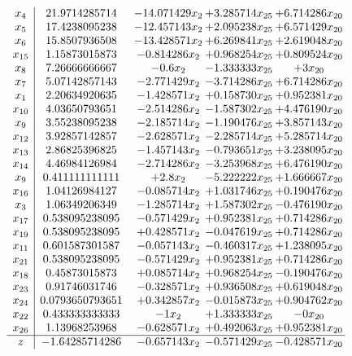 \documentclass[11pt]{article}
\begin{document}
\[\begin{array}{c| c c@{\hskip 2pt} c@{\hskip 2pt} c@{\hskip 2pt} }
 x_{4}   &  21.9714285714 & -14.071429 x_{2} & + 3.285714 x_{25} & + 6.714286 x_{20}\\
 x_{5}   &  17.4238095238 & -12.457143 x_{2} & + 2.095238 x_{25} & + 6.571429 x_{20}\\
 x_{6}   &  15.8507936508 & -13.428571 x_{2} & + 6.269841 x_{25} & + 2.619048 x_{20}\\
 x_{15}   &  1.15873015873 & -0.814286 x_{2} & + 0.968254 x_{25} & + 0.809524 x_{20}\\
 x_{8}   &  7.26666666667 & -0.6 x_{2} & -1.333333 x_{25} & + 3 x_{20}\\
 x_{7}   &  5.07142857143 & -2.771429 x_{2} & -3.714286 x_{25} & + 6.714286 x_{20}\\
 x_{1}   &  2.20634920635 & -1.428571 x_{2} & + 0.158730 x_{25} & + 0.952381 x_{20}\\
 x_{10}   &  4.03650793651 & -2.514286 x_{2} & -1.587302 x_{25} & + 4.476190 x_{20}\\
 x_{9}   &  3.55238095238 & -2.185714 x_{2} & -1.190476 x_{25} & + 3.857143 x_{20}\\
 x_{12}   &  3.92857142857 & -2.628571 x_{2} & -2.285714 x_{25} & + 5.285714 x_{20}\\
 x_{13}   &  2.86825396825 & -1.457143 x_{2} & -0.793651 x_{25} & + 3.238095 x_{20}\\
 x_{14}   &  4.46984126984 & -2.714286 x_{2} & -3.253968 x_{25} & + 6.476190 x_{20}\\
 x_{9}   &  0.411111111111 & + 2.8 x_{2} & -5.222222 x_{25} & + 1.666667 x_{20}\\
 x_{16}   &  1.04126984127 & -0.085714 x_{2} & + 1.031746 x_{25} & + 0.190476 x_{20}\\
 x_{3}   &  1.06349206349 & -1.285714 x_{2} & + 1.587302 x_{25} & -0.476190 x_{20}\\
 x_{17}   &  0.538095238095 & -0.571429 x_{2} & + 0.952381 x_{25} & + 0.714286 x_{20}\\
 x_{19}   &  0.538095238095 & + 0.428571 x_{2} & -0.047619 x_{25} & + 0.714286 x_{20}\\
 x_{11}   &  0.601587301587 & -0.057143 x_{2} & -0.460317 x_{25} & + 1.238095 x_{20}\\
 x_{21}   &  0.538095238095 & -0.571429 x_{2} & + 0.952381 x_{25} & + 0.714286 x_{20}\\
 x_{18}   &  0.45873015873 & + 0.085714 x_{2} & + 0.968254 x_{25} & -0.190476 x_{20}\\
 x_{23}   &  0.91746031746 & -0.328571 x_{2} & + 0.936508 x_{25} & + 0.619048 x_{20}\\
 x_{24}   &  0.0793650793651 & + 0.342857 x_{2} & -0.015873 x_{25} & + 0.904762 x_{20}\\
 x_{22}   &  0.433333333333 & -1 x_{2} & + 1.333333 x_{25} & -0 x_{20}\\
 x_{26}   &  1.13968253968 & -0.628571 x_{2} & + 0.492063 x_{25} & + 0.952381 x_{20}\\
\hline
z    &  -1.64285714286 & -0.657143 x_{2} & -0.571429 x_{25} & -0.428571 x_{20}\\
\end{array}\]
\end{document}
